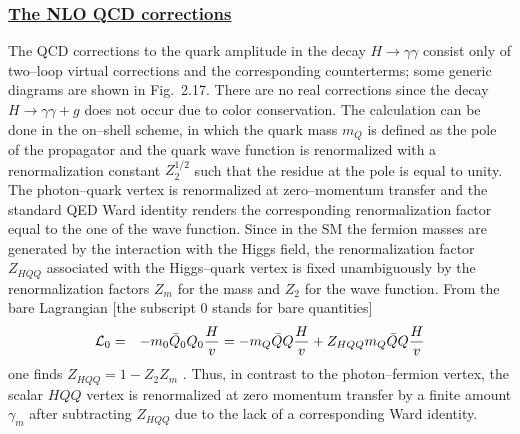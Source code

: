 \subsubsection*{\underline{The NLO QCD corrections}}

The QCD corrections to the quark amplitude in the decay $H \to \gamma \gamma$
consist only of two--loop virtual corrections and the corresponding 
counterterms; some generic diagrams are shown in Fig.~2.17. There are no real
corrections since the decay $H \to \gamma \gamma +g$ does not occur due to color
conservation. The calculation can be done in the on--shell scheme, in which  
the quark mass $m_Q$ is defined as the pole of the propagator and the quark 
wave function is renormalized with a renormalization constant $Z_2^{1/2}$ such 
that the residue at the pole is equal to unity.  The photon--quark vertex is 
renormalized at zero--momentum transfer and the standard QED Ward identity 
renders the corresponding renormalization factor equal to the one of the wave
function.  Since in the SM  the fermion masses are generated by the interaction
with the Higgs field, the renormalization factor $Z_{HQQ}$ associated with the
Higgs--quark vertex  is fixed unambiguously by the renormalization factors
$Z_m$ for the mass and $Z_2$ for the wave function.  From the bare Lagrangian
[the subscript $0$ stands for bare quantities]
\begin{eqnarray}
{\cal L}_0 & = & -m_0 \bar Q_0 Q_0 \frac{H}{v} = -m_Q \bar Q Q \frac{H}{v}
                 + Z_{HQQ} m_Q \bar Q Q \frac{H}{v}
\end{eqnarray}
one finds $Z_{HQQ} = 1-Z_2 Z_m$ \cite{HqqQCD-1loop,Drees+Hikasa}. Thus, in 
contrast to the photon--fermion vertex, the scalar $HQQ$ vertex is renormalized
at zero momentum transfer by a finite amount $\gamma_m$ after subtracting 
$Z_{HQQ}$ due to the lack of a corresponding Ward identity.\s 

